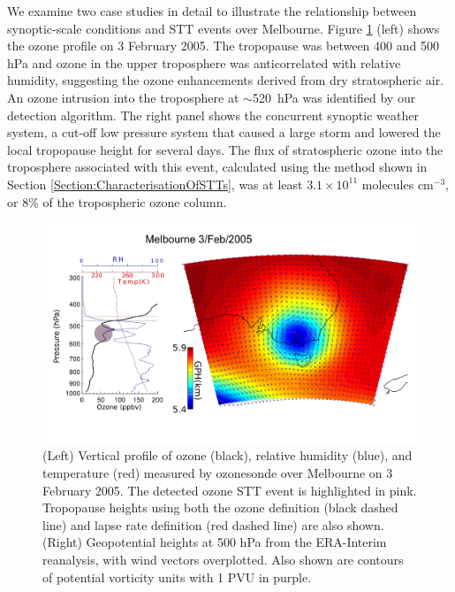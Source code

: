 \documentclass{article}
\begin{document}
    We examine two case studies in detail to illustrate the relationship between synoptic-scale conditions and STT events  over Melbourne.
    Figure \ref{fig:Melbourne20050203} (left) shows the ozone profile on 3 February 2005.
    The tropopause was between 400 and 500 hPa and ozone in the upper troposphere was anticorrelated with relative humidity, suggesting the ozone enhancements derived from dry stratospheric air. 
    An ozone intrusion into the troposphere at $\sim$520~hPa was identified by our detection algorithm.
    The right panel shows the concurrent synoptic weather system, a cut-off low pressure system that caused a large storm and lowered the local tropopause height for several days.
    The flux of stratospheric ozone into the troposphere associated with this event, calculated using the method shown in Section \ref{Section:CharacterisationOfSTTs}, was at least $3.1 \times 10^{11}$ molecules cm$^{-3}$, or 8\% of the tropospheric ozone column.

    \begin{figure}[!htbp]
      \begin{center}
      \includegraphics[width=1.0\columnwidth]{figures/Melbourne20050203.png}
      \caption{(Left) Vertical profile of ozone (black), relative humidity (blue), and temperature (red) measured by ozonesonde over Melbourne on 3 February 2005.
      The detected ozone STT event is highlighted in pink.
      Tropopause heights using both the ozone definition (black dashed line) and lapse rate definition (red dashed line) are also shown.
      (Right) Geopotential heights at 500 hPa from the ERA-Interim reanalysis, with wind vectors overplotted.
      Also shown are contours of potential vorticity units with 1 PVU in purple.}
      \label{fig:Melbourne20050203}
      \end{center}
    \end{figure}
    
\end{document}
